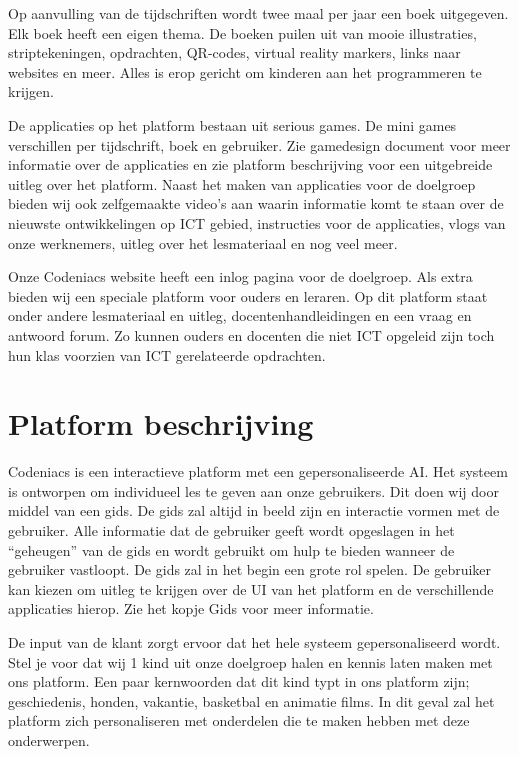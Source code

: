 \documentclass[]{report}
\begin{document}
Op aanvulling van de tijdschriften wordt twee maal per jaar een boek uitgegeven. Elk boek heeft een eigen thema. De boeken puilen uit van mooie illustraties, striptekeningen, opdrachten, QR-codes, virtual reality markers, links naar websites en meer. Alles is erop gericht om kinderen aan het programmeren te krijgen.

De applicaties op het platform bestaan uit serious games. De mini games verschillen per tijdschrift, boek en gebruiker. Zie gamedesign document voor meer informatie over de applicaties en zie platform beschrijving voor een uitgebreide uitleg over het platform.
Naast het maken van applicaties voor de doelgroep bieden wij ook zelfgemaakte video's aan waarin informatie komt te staan over de nieuwste ontwikkelingen op ICT gebied, instructies voor de applicaties, vlogs van onze werknemers, uitleg over het lesmateriaal en nog veel meer.

Onze Codeniacs website heeft een inlog pagina voor de doelgroep. Als extra bieden wij een speciale platform voor ouders en leraren. Op dit platform staat onder andere lesmateriaal en uitleg, docentenhandleidingen en een vraag en antwoord forum. Zo kunnen ouders en docenten die niet ICT opgeleid zijn toch hun klas voorzien van ICT gerelateerde opdrachten.


\section{Platform beschrijving}
Codeniacs is een interactieve platform met een gepersonaliseerde AI. Het systeem is ontworpen om individueel les te geven aan onze gebruikers. Dit doen wij door middel van een gids. De gids zal altijd in beeld zijn en interactie vormen met de gebruiker. Alle informatie dat de gebruiker geeft wordt opgeslagen in het “geheugen” van de gids en wordt gebruikt om hulp te bieden wanneer de gebruiker vastloopt. De gids zal in het begin een grote rol spelen. De gebruiker kan kiezen om uitleg te krijgen over de UI van het platform en de verschillende applicaties hierop. Zie het kopje Gids voor meer informatie.

De input van de klant zorgt ervoor dat het hele systeem gepersonaliseerd wordt. Stel je voor dat wij 1 kind uit onze doelgroep halen en kennis laten maken met ons platform. Een paar kernwoorden dat dit kind typt in ons platform zijn; geschiedenis, honden, vakantie, basketbal en animatie films. In dit geval zal het platform zich personaliseren met onderdelen die te maken hebben met deze onderwerpen.
\end{document}
